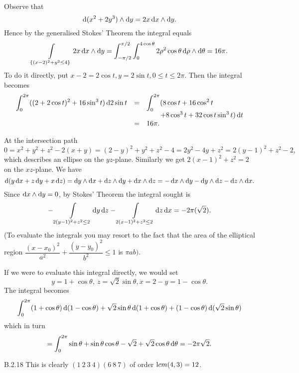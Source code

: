 \begin{Answer}{13.15}
 Observe that
$$ \d{(x^2 + 2y^3)\wedge\d{y}} = 2x\d{x}\wedge\d{y}.$$Hence by the
generalised Stokes' Theorem the integral equals $$\dint
\limits_{\{(x - 2)^2 + y^2 \leq 4\}} 2x\d{x}\wedge\d{y} = \dint
_{-\pi/2} ^{\pi/2} \dint _0 ^{4\cos\theta} 2\rho^2 \cos\theta\d{\rho}
\wedge\d\theta = 16\pi .
$$
To do it directly, put $x - 2 = 2\cos t, y = 2\sin t, 0 \leq t \leq
2\pi$. Then the integral becomes
$$\begin{array}{lll}\dint _0 ^{2\pi} ((2 + 2\cos t)^2 + 16\sin^3t)\d{2\sin t} & = & \dint _0 ^{2\pi} (8\cos t + 16\cos^2 t\\ & & \qquad  + 8\cos^3t + 32\cos t\sin^3t) \d{t}\\ & =  & 16\pi.  \end{array}  $$

\end{Answer}
\begin{Answer}{13.16}
 At the
intersection path
$$ 0 = x^2 + y^2 + z^2 - 2(x + y) = (2 - y)^2 + y^2 + z^2 - 4 = 2y^2 - 4y + z^2 = 2(y - 1)^2 + z^2 - 2,  $$
which describes an ellipse on the $yz$-plane. Similarly we get $2(x
- 1)^2 + z^2 = 2$ on the $xz$-plane.  We have
$$ \d{\left(y\d{x} + z\d{y} + x\d{z}\right)}  = \d{y}\wedge\d{x} +
\d{z}\wedge\d{y} + \d{x}\wedge\d{z} = -\d{x}\wedge\d{y}
-\d{y}\wedge\d{z} - \d{z}\wedge\d{x}.$$ Since $\d{x}\wedge \d{y} =
0$, by Stokes' Theorem the integral sought is
$$ -\dint \limits_{2(y - 1)^2 + z^2 \leq 2} \d{y}\d{z}  -\dint \limits_{2(x- 1)^2 + z^2 \leq 2} \d{z}\d{x}
= -2\pi (\sqrt{2}). $$ (To evaluate the integrals you may resort to
the fact that  the area of the elliptical region
$\dfrac{(x-x_0)^2}{a^2} + \dfrac{(y-y_0)^2}{b^2} \leq 1$ is $\pi
ab)$.

\bigskip

If we were to evaluate this integral directly, we would set $$  y =
1 + \cos \theta, \ z =  \sqrt{2}\sin \theta , x = 2 - y = 1 -
\cos\theta .
$$The integral becomes
$$ \dint _0 ^{2\pi} (1 + \cos \theta)\d{(1 - \cos \theta)} + \sqrt{2}\sin\theta\d{(1 + \cos\theta)} + (1 - \cos\theta)\d{(\sqrt{2}\sin\theta)} $$
which in turn $$ = \dint_0 ^{2\pi} \sin\theta + \sin\theta\cos\theta
- \sqrt{2} + \sqrt{2}\cos\theta \d{\theta} = -2\pi\sqrt{2}.$$
\end{Answer}
\begin{Answer}{B.2.18}
 This is clearly
$(1\ 2\ 3 \ 4)(6\ 8\ 7) $ of order ${\textrm  lcm} (4, 3) = 12$.
\end{Answer}
